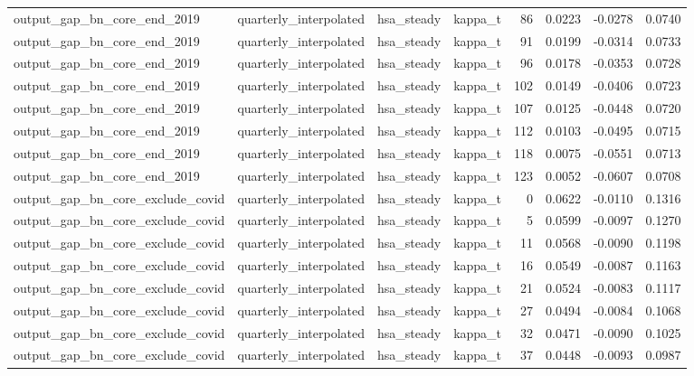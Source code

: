 \begin{tabular}{llllrrrr}
output\_gap\_bn\_core\_end\_2019 & quarterly\_interpolated & hsa\_steady & kappa\_t & 86 & 0.0223 & -0.0278 & 0.0740 \\
output\_gap\_bn\_core\_end\_2019 & quarterly\_interpolated & hsa\_steady & kappa\_t & 91 & 0.0199 & -0.0314 & 0.0733 \\
output\_gap\_bn\_core\_end\_2019 & quarterly\_interpolated & hsa\_steady & kappa\_t & 96 & 0.0178 & -0.0353 & 0.0728 \\
output\_gap\_bn\_core\_end\_2019 & quarterly\_interpolated & hsa\_steady & kappa\_t & 102 & 0.0149 & -0.0406 & 0.0723 \\
output\_gap\_bn\_core\_end\_2019 & quarterly\_interpolated & hsa\_steady & kappa\_t & 107 & 0.0125 & -0.0448 & 0.0720 \\
output\_gap\_bn\_core\_end\_2019 & quarterly\_interpolated & hsa\_steady & kappa\_t & 112 & 0.0103 & -0.0495 & 0.0715 \\
output\_gap\_bn\_core\_end\_2019 & quarterly\_interpolated & hsa\_steady & kappa\_t & 118 & 0.0075 & -0.0551 & 0.0713 \\
output\_gap\_bn\_core\_end\_2019 & quarterly\_interpolated & hsa\_steady & kappa\_t & 123 & 0.0052 & -0.0607 & 0.0708 \\
output\_gap\_bn\_core\_exclude\_covid & quarterly\_interpolated & hsa\_steady & kappa\_t & 0 & 0.0622 & -0.0110 & 0.1316 \\
output\_gap\_bn\_core\_exclude\_covid & quarterly\_interpolated & hsa\_steady & kappa\_t & 5 & 0.0599 & -0.0097 & 0.1270 \\
output\_gap\_bn\_core\_exclude\_covid & quarterly\_interpolated & hsa\_steady & kappa\_t & 11 & 0.0568 & -0.0090 & 0.1198 \\
output\_gap\_bn\_core\_exclude\_covid & quarterly\_interpolated & hsa\_steady & kappa\_t & 16 & 0.0549 & -0.0087 & 0.1163 \\
output\_gap\_bn\_core\_exclude\_covid & quarterly\_interpolated & hsa\_steady & kappa\_t & 21 & 0.0524 & -0.0083 & 0.1117 \\
output\_gap\_bn\_core\_exclude\_covid & quarterly\_interpolated & hsa\_steady & kappa\_t & 27 & 0.0494 & -0.0084 & 0.1068 \\
output\_gap\_bn\_core\_exclude\_covid & quarterly\_interpolated & hsa\_steady & kappa\_t & 32 & 0.0471 & -0.0090 & 0.1025 \\
output\_gap\_bn\_core\_exclude\_covid & quarterly\_interpolated & hsa\_steady & kappa\_t & 37 & 0.0448 & -0.0093 & 0.0987 \\

\end{tabular}
